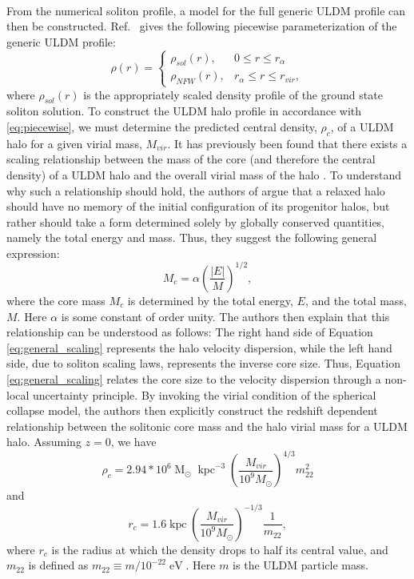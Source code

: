 \documentclass[a4paper,11pt]{article}
\begin{document}
\

From the numerical soliton profile, a model for the full generic ULDM profile can then be constructed.
Ref.~\cite{Robles:2018fur} gives the following piecewise parameterization of the generic ULDM profile:
%
\begin{equation}\label{eq:piecewise}
     \rho(r)=
    \begin{cases}
      \rho_{sol}(r), & 0\leq r \leq r_{\alpha} \\
      \rho_{NFW}(r), & r_{\alpha}\leq r \leq r_{vir},
    \end{cases}
\end{equation}
%
where $\rho_{sol}(r)$ is the appropriately scaled density profile of the ground state soliton solution. 
To construct the ULDM halo profile in accordance with \ref{eq:piecewise}, we must determine the predicted central density, $\rho_c$, of a ULDM halo for a given virial mass, $M_{vir}$. It has previously been found that there exists a scaling relationship between the mass of the core (and therefore the central density) of a ULDM halo and the overall virial mass of the halo \cite{Schive:2014hza}. To understand why such a relationship should hold, the authors of \cite{Schive:2014hza} argue that a relaxed halo should have no memory of the initial configuration of its progenitor halos, but rather should take a form determined solely by globally conserved quantities, namely the total energy and mass. Thus, they suggest the following general expression:
\begin{equation}\label{eq:general_scaling}
    M_c = \alpha \left(\frac{\vert E\vert}{M}\right)^{1/2},
\end{equation}
where the core mass $M_c$ is determined by the total energy, $E$, and the total mass, $M$. Here $\alpha$ is some constant of order unity. The authors then explain that this relationship can be understood as follows: The right hand side of Equation \ref{eq:general_scaling} represents the halo velocity dispersion, while the left hand side, due to soliton scaling laws, represents the inverse core size. Thus, Equation \ref{eq:general_scaling} relates the core size to the velocity dispersion through a non-local uncertainty principle. By invoking the virial condition of the spherical collapse model, the authors then explicitly construct the redshift dependent relationship between the solitonic core mass and the halo virial mass for a ULDM halo. Assuming $z = 0$, we have 
\begin{equation}\label{eq:central_dens}
    \rho_c = 2.94*10^6 \operatorname{M}_{\odot}\operatorname{kpc}^{-3}\left(\frac{M_{vir}}{10^9 M_{\odot}}\right)^{4/3}m_{22}^{2}
\end{equation}
and 
\begin{equation}
    r_c = 1.6 \operatorname{kpc}\left(\frac{M_{vir}}{10^9 M_{\odot}}\right)^{-1/3}\frac{1}{m_{22}},
\end{equation}
where $r_c$ is the radius at which the density drops to half its central value, and $m_{22}$ is defined as $m_{22} \equiv m / 10^{-22} \operatorname{eV}$. Here $m$ is the ULDM particle mass. 
\end{document}
